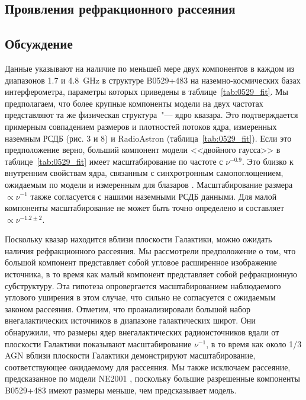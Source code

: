 \subsection{Проявления рефракционного рассеяния}

\subsection{Обсуждение}

Данные указывают на наличие по меньшей мере двух компонентов в каждом из диапазонов 1.7 и
\SI{4.8}{\GHz} в структуре B0529+483 на наземно-космических базах интерферометра, параметры которых
приведены в таблице~\ref{tab:0529_fit}. Мы предполагаем, что более крупные компоненты модели на
двух частотах представляют та же физическая структура~"--- ядро квазара. Это подтверждается
примерным совпадением размеров и плотностей потоков ядра, измеренных наземным РСДБ (рис. 3 и
8) и RadioAstron (таблица~\ref{tab:0529_fit}). Если это предположение верно, больший компонент
модели <<двойного гаусса>> в таблице~\ref{tab:0529_fit} имеет масштабирование по частоте с
$\nu^{-0.9}$. Это близко к внутренним свойствам ядра, связанным с синхротронным самопоглощением,
ожидаемым по модели \cite{Blandford_Konigl_1979} и измеренным для блазаров \cite{Kutkin_2014}.
Масштабирование размера $\propto\nu^{-1}$ также согласуется с нашими наземными РСДБ данными. Для
малой компоненты масштабирование не может быть точно определено и составляет
$\propto\nu^{-1.2\pm2}$.

Поскольку квазар находится вблизи плоскости Галактики, можно ожидать наличия рефракционного
рассеяния. Мы рассмотрели предположение о том, что большой компонент представляет собой угловое
расширенное изображение источника, в то время как малый компонент представляет собой рефракционную
субструктуру. Эта гипотеза опровергается масштабированием наблюдаемого углового уширения в этом
случае, что сильно не согласуется с ожидаемым законом рассеяния. Отметим, что
\cite{Pushkarev_Kovalev_2015} проанализировали большой набор внегалактических источников в диапазоне
галактических широт. Они обнаружили, что размеры ядер внегалактических радиоисточников вдали от
плоскости Галактики показывают масштабирование $\nu^{-1}$, в то время как около 1/3 AGN вблизи
плоскости Галактики демонстрируют масштабирование, соответствующее ожидаемому для рассеяния. Мы
также исключаем рассеяние, предсказанное по модели NE2001 \cite{Cordes_2002}, поскольку большие
разрешенные компоненты B0529+483 имеют размеры меньше, чем предсказывает модель.

